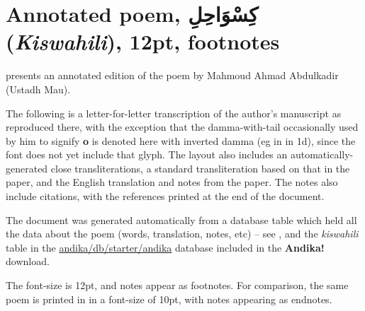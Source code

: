 \chapter{Annotated poem, \textarabic{كِسْوَاحِلِ} (\textit{Kiswahili}), 12pt, footnotes}
\renewcommand{\thesection}{D/\arabic{section}}  %
\setcounter{section}{0}  %
\label{appD}

\citet{Abdulkadir2013} presents an annotated edition of the poem  by Mahmoud Ahmad Abdulkadir (Ustadh Mau).

The following is a letter-for-letter transcription of the author's manuscript as reproduced there, with the exception that the damma-with-tail occasionally used by him to signify \textbf{o} is denoted here with inverted damma (eg in  in 1d), since the font does not yet include that glyph.  The layout also includes an automatically-generated close transliterations, a standard transliteration based on that in the paper, and the English translation and notes from the paper.  The notes also include citations, with the references printed at the end of the document.

The document was generated automatically from a database table which held all the data about the poem (words, translation, notes, etc) -- see , and the \textit{kiswahili} table in the \url{andika/db/starter/andika} database included in the \textbf{Andika!} download.

The font-size is 12pt, and notes appear as footnotes.  For comparison, the same poem is printed in  in a font-size of 10pt, with notes appearing as endnotes.



